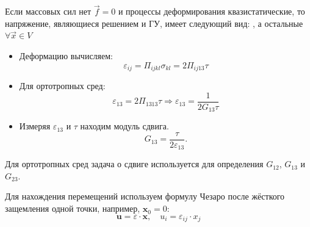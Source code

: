 Если массовых сил нет $\vec{f} = 0$ и процессы деформирования квазистатические, то напряжение, являющиеся решением и ГУ, имеет следующий вид:
, а остальные  $\forall \vec{x} \in V$
\begin{itemize}
	\item Деформацию вычисляем:
	\begin{equation*}
		\varepsilon_{ij} = \Pi_{ijkl} \sigma_{kl} = 2 \Pi_{ij13} \tau
	\end{equation*}
	
	\item Для ортотропных сред:
	\begin{equation*}
		\varepsilon_{13} = 2 \Pi_{1313} \tau \Rightarrow \varepsilon_{13} = \frac{1}{2 G_{13} \tau}
	\end{equation*}
	
	\item Измеряя $\varepsilon_{13}$ и $\tau$ находим модуль сдвига. 
	\begin{equation*}
		\boxed{G_{13} = \frac{\tau}{2 \varepsilon_{13}}.}
	\end{equation*}
\end{itemize}

Для ортотропных сред задача о сдвиге используется для определения $G_{12}$, $G_{13}$ и $G_{23}$.

Для нахождения перемещений используем формулу Чезаро после жёсткого защемления одной точки, например, $\mathbf{x}_0 = 0$:
\begin{equation*}
	\boxed{\mathbf{u} = \varepsilon \cdot \mathbf{x}}, \quad \boxed{u_i = \varepsilon_{ij} \cdot x_{j}}
\end{equation*} 